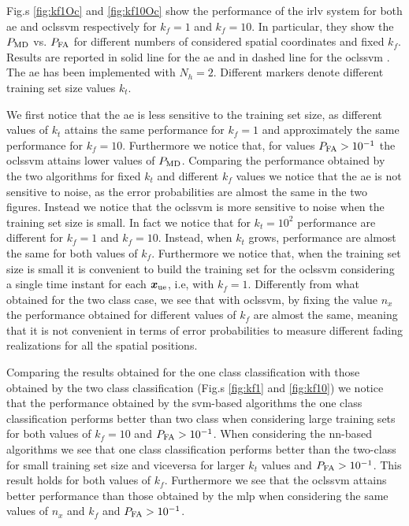 \documentclass[draftcls,onecolumn,12pt]{IEEEtran}
\begin{document}
Fig.s \ref{fig:kf1Oc} and \ref{fig:kf10Oc} show the performance of the \ac{irlv} system for both \ac{ae} and \ac{oclssvm} respectively for $k_f = 1$ and $k_f = 10$. In particular, they show the $P_{\rm MD}$ vs. $P_{\rm FA}$ for different numbers of considered spatial coordinates and fixed $k_f$. Results are reported in solid line for the \ac{ae} and in dashed line for the \ac{oclssvm} . The \ac{ae} has been implemented with $N_h=2$. Different markers denote different training set size values $k_t$.

We first notice that the \ac{ae} is less sensitive to the training set size, as different values of $k_t$ attains the same performance for $k_f=1$ and approximately the same performance for $k_f = 10$. Furthermore we notice that, for values $P_{\rm FA} > 10^{-1}$ the \ac{oclssvm} attains lower values of $P_{\rm MD}$. Comparing the performance obtained by the two algorithms for fixed $k_t$ and different $k_f$ values we notice that the \ac{ae} is not sensitive to noise, as the error probabilities are almost the same in the two figures. Instead we notice that the \ac{oclssvm} is more sensitive to noise when the training set size is small. In fact we notice that for $k_t=10^2$ performance are different for $k_f=1$ and $k_f=10$. Instead, when $k_t$ grows, performance are almost the same for both values of $k_f$. Furthermore we notice that, when the training set size is small it is convenient to build the training set for the \ac{oclssvm} considering a single time instant for each $\bm{x}_{\rm ue}$, i.e, with $k_f = 1$. Differently from what obtained for the two class case, we see that with \ac{oclssvm}, by fixing the value $n_x$ the performance obtained for different values of $k_f$ are almost the same, meaning that it is not convenient in terms of error probabilities to measure different fading realizations for all the spatial positions.

Comparing the results obtained for the one class classification with those obtained by the two class classification (Fig.s \ref{fig:kf1} and \ref{fig:kf10}) we notice that the performance obtained by the \ac{svm}-based algorithms the one class classification performs better than two class when considering large training sets for both values of $k_f = 10$ and $P_{\rm FA}>10^{-1}$. When considering the \ac{nn}-based algorithms we see that one class classification performs better than the two-class for small training set size and viceversa for larger $k_t$ values and $P_{\rm FA} > 10^{-1}$. This result holds for both values of $k_f$. Furthermore we see that the \ac{oclssvm} attains better performance than those obtained by the \ac{mlp} when considering the same values of $n_x$ and $k_f$ and $P_{\rm FA}> 10^{-1}$.
\end{document}
